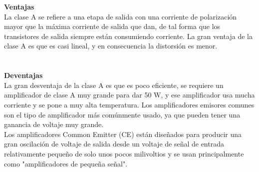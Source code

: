 \documentclass[10pt,a4paper]{article}
\begin{document}
\textbf{Ventajas}\\
La clase A se refiere a una etapa de salida con una corriente de polarización mayor que la máxima corriente de salida que dan, de tal forma que los transistores de salida siempre están consumiendo corriente. La gran ventaja de la clase A es que es casi lineal, y en consecuencia la distorsión es menor.\\\\\\
\textbf{Deventajas}\\
La gran desventaja de la clase A es que es poco eficiente, se requiere un amplificador de clase A muy grande para dar 50 W, y ese amplificador usa mucha corriente y se pone a muy alta temperatura. 
\newpage
Los amplificadores emisores comunes son el tipo de amplificador más comúnmente usado, ya que pueden tener una ganancia de voltaje muy grande.\\
Los amplificadores Common Emitter (CE) están diseñados para producir una gran oscilación de voltaje de salida desde un voltaje de señal de entrada relativamente pequeño de solo unos pocos milivoltios y se usan principalmente como "amplificadores de pequeña señal".\\\\
\end{document}
